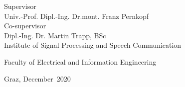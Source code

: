 \begin{titlingpage}
\begin{center}
\vfill\vfill\vfill
\vfill\vfill\vfill

Supervisor\\
Univ.-Prof. Dipl.-Ing. Dr.\thinspace{}mont. Franz Pernkopf\\
\vfill
Co-supervisor\\
Dipl.-Ing. Dr. Martin Trapp, BSc\\
\vfill
\vfill
Institute of Signal Processing and Speech Communication\\

\vfill

Faculty of Electrical and Information Engineering

\vfill\vfill\vfill

{\scriptsize Graz, December~2020}

\end{center}
\end{titlingpage}

